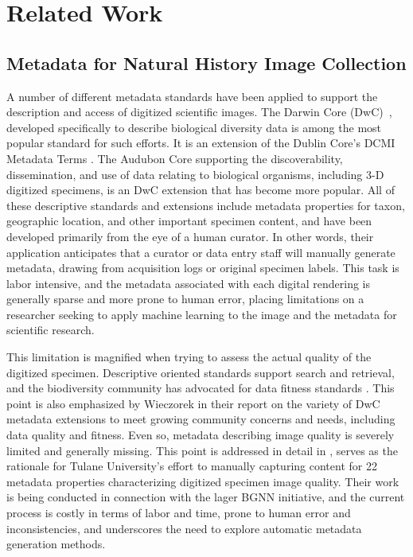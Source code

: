 \documentclass[conference]{IEEEtran}
\begin{document}
\section{Related Work}
\subsection{Metadata for Natural History Image Collection}
A number of different metadata standards have been applied to support the description and access of digitized scientific images. The Darwin Core (DwC)~\cite{biodiv_info_standards}, developed specifically to describe biological diversity data is among the most popular standard for such efforts. It is an extension of the Dublin Core's DCMI Metadata Terms \cite{dc_terms}. The Audubon Core\cite{audub_core} supporting the discoverability, dissemination, and use of data relating to biological organisms, including 3-D digitized specimens, is an DwC extension that has become more popular. All of these descriptive standards and extensions include metadata properties for taxon, geographic location, and other important specimen content, and have been developed primarily from the eye of a human curator. In other words, their application anticipates that a curator or data entry staff will manually generate metadata, drawing from acquisition logs or original specimen labels. This task is labor intensive, and the metadata associated with each digital rendering is generally sparse and more prone to human error, placing limitations on a researcher seeking to apply machine learning to the image and the metadata for scientific research.

This limitation is magnified when trying to assess the actual quality of the digitized specimen. Descriptive oriented standards support search and retrieval, and the biodiversity community has advocated for data fitness standards \cite{chapman2020developing}. This point is also emphasized by Wieczorek\cite{wieczorek2012darwin} in their report on the variety of DwC metadata extensions to meet growing community concerns and needs, including data quality and fitness. Even so, metadata describing image quality is severely limited and generally missing. This point is addressed in detail in \cite{leipzig2021biodiversity}, serves as the rationale for Tulane University's effort to manually capturing content for 22 metadata properties characterizing digitized specimen image quality. Their work is being conducted in connection with the lager BGNN initiative, and the current process is costly in terms of labor and time, prone to human error and inconsistencies, and underscores the need to
explore automatic metadata generation methods.
\end{document}
